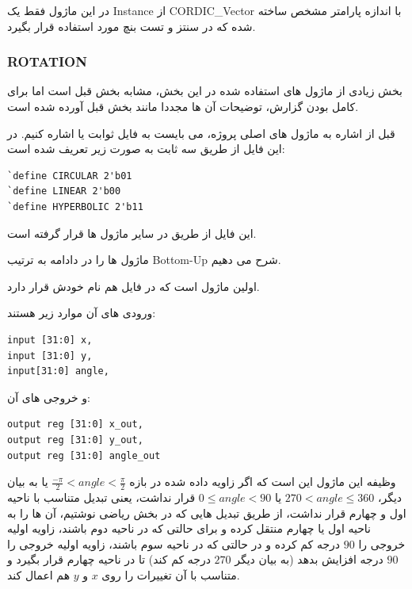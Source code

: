 \documentclass[12pt,titlepage,a4page , tikz , multi,table , svgnames,xcdraw]{article}
\begin{document}
در این ماژول فقط یک Instance از CORDIC\_Vector با اندازه پارامتر مشخص ساخته شده که در سنتز و تست بنچ مورد استفاده قرار بگیرد.


\newpage
\subsubsection{ROTATION}
بخش زیادی از ماژول های استفاده شده در این بخش، مشابه بخش قبل است اما برای کامل بودن گزارش، توضیحات آن ها مجددا مانند بخش قبل آورده شده است.




قبل از اشاره به ماژول های اصلی پروژه، می بایست به فایل ثوابت یا  اشاره کنیم. در این فایل از طریق  سه ثابت به صورت زیر تعریف شده است:
\begin{latin}
\begin{verbatim}
`define CIRCULAR 2'b01
`define LINEAR 2'b00
`define HYPERBOLIC 2'b11
\end{verbatim}
\end{latin}

این فایل از طریق  در سایر ماژول ها قرار گرفته است.

ماژول ها را در دادامه به ترتیب Bottom-Up شرح می دهیم.

اولین ماژول  است که در فایل هم نام خودش قرار دارد. 

 ورودی های آن موارد زیر هستند:

\begin{latin}
\begin{verbatim}
input [31:0] x,
input [31:0] y,
input[31:0] angle,
\end{verbatim}
\end{latin}

و خروجی های آن:

\begin{latin}
\begin{verbatim}
output reg [31:0] x_out,
output reg [31:0] y_out,
output reg [31:0] angle_out
\end{verbatim}
\end{latin}

وظیفه این ماژول این است که اگر زاویه داده شده در بازه
 $\frac{-\pi}{2} < angle < \frac{\pi}{2}$
 یا به بیان دیگر،
 $270 < angle \leq 360$
 یا
 $0 \leq angle <90$
 قرار نداشت،
یعنی تبدیل متناسب با ناحیه اول و چهارم قرار نداشت، از طریق تبدیل هایی که در بخش ریاضی نوشتیم، آن ها را به ناحیه اول یا چهارم منتقل کرده و برای حالتی که در ناحیه دوم باشند، زاویه اولیه خروجی را $90$ درجه کم کرده و در حالتی که در ناحیه سوم باشند، زاویه اولیه خروجی را $90$ درجه افزایش بدهد (به بیان دیگر $270$ درجه کم کند) تا در ناحیه چهارم قرار بگیرد و متناسب با آن تغییرات را روی $x$ و $y$ هم اعمال کند.
\end{document}
